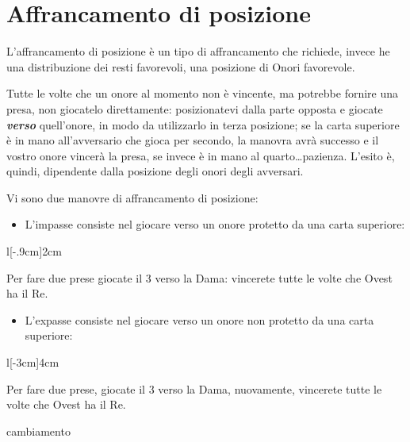 \documentclass[../corsofiori.tex]{subfiles}
\begin{document}
\newpage

\section{Affrancamento di posizione}

L'affrancamento di posizione è un tipo di affrancamento che richiede, invece he una distribuzione dei resti favorevoli,
una posizione di Onori favorevole.

Tutte le volte che un onore al momento non è vincente, ma potrebbe fornire una presa, non giocatelo direttamente:
posizionatevi dalla parte opposta e giocate \emph{\textbf{verso}} quell'onore, in modo da utilizzarlo in terza
posizione; se la carta superiore è in mano all'avversario che gioca per secondo, la manovra avrà successo e il vostro
onore vincerà la presa, se invece è in mano al quarto\ldots pazienza. L'esito è, quindi, dipendente dalla posizione
degli onori degli avversari.

Vi sono due manovre di affrancamento di posizione:

\begin{itemize}
    \item L'impasse consiste nel giocare verso un onore protetto da una carta superiore:
\end{itemize}

\begin{wraptable}[2]{l}[-.9cm]{2cm}
    \vspace{-1.3cm}
\end{wraptable}

        Per fare due prese giocate il 3 verso la Dama: vincerete tutte le volte che Ovest ha il Re.

\begin{itemize}
    \item L'expasse consiste nel giocare verso un onore non protetto da una carta superiore:
\end{itemize}
\bigskip

\begin{wraptable}[3]{l}[-3cm]{4cm}
    \vspace{-1.3cm}
\end{wraptable}

Per fare due prese, giocate il 3 verso la Dama, nuovamente, vincerete tutte le volte che Ovest ha il Re.


cambiamento
\end{document}
